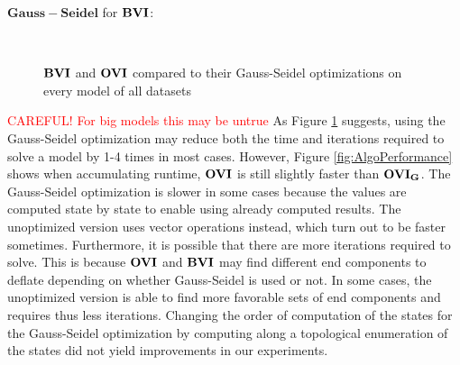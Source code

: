 $\mathbf{Gauss-Seidel}$ for $\mathbf{BVI}$:
\begin{figure}[h!]
    \centering
    \
    \caption{$\mathbf{BVI}$ and $\mathbf{OVI}$ compared to their Gauss-Seidel optimizations on every model of all datasets}%
    \label{fig:Scatter_G}%
    \end{figure}
\FloatBarrier

\textcolor{red}{CAREFUL! For big models this may be untrue}
As Figure \ref{fig:Scatter_G} suggests, using the Gauss-Seidel optimization may reduce both the time and iterations required to solve a model by 1-4 times in most cases.
However, Figure \ref{fig:AlgoPerformance} shows when accumulating runtime, $\mathbf{OVI}$ is still slightly faster than $\mathbf{OVI_G}$.
The Gauss-Seidel optimization is slower in some cases because the values are computed state by state to enable using already computed results.
The unoptimized version uses vector operations instead, which turn out to be faster sometimes.
Furthermore, it is possible that there are more iterations required to solve. 
This is because $\mathbf{OVI}$ and $\mathbf{BVI}$ may find different end components to deflate depending on whether Gauss-Seidel is used or not.
In some cases, the unoptimized version is able to find more favorable sets of end components and requires thus less iterations.
Changing the order of computation of the states for the Gauss-Seidel optimization by computing along a topological enumeration of the states did not
yield improvements in our experiments.  

